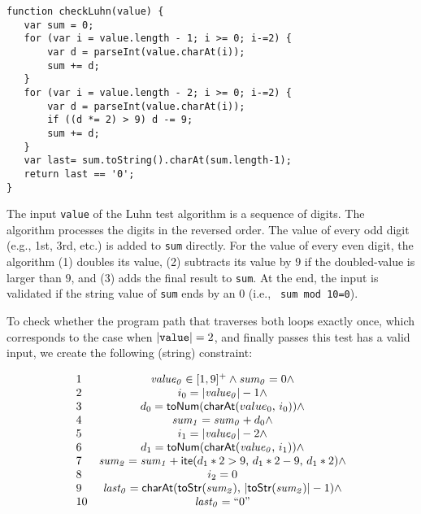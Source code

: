 \documentclass[sigplan,review,anonymous]{acmart}\settopmatter{printfolios=true,printccs=false,printacmref=false}
\begin{document}
%

\begin{Verbatim}[fontsize=\small]
function checkLuhn(value) {
   var sum = 0;
   for (var i = value.length - 1; i >= 0; i-=2) {
       var d = parseInt(value.charAt(i));
       sum += d;
   }	
   for (var i = value.length - 2; i >= 0; i-=2) {
       var d = parseInt(value.charAt(i));
       if ((d *= 2) > 9) d -= 9;
       sum += d;
   }
   var last= sum.toString().charAt(sum.length-1);
   return last == '0';
}
\end{Verbatim}


The input \verb|value| of the Luhn test algorithm is a sequence of digits. The algorithm processes the digits in the reversed order. The value of every odd digit (e.g., 1st, 3rd, etc.) is added to \verb|sum| directly. For the value of every even digit, the algorithm (1) doubles its value, (2) subtracts its value by $9$ if the doubled-value is larger than $9$, and (3) adds the final result to \verb|sum|. At the end, the input is validated if the string value of \verb|sum| ends by an $0$ (i.e., \verb| sum mod 10=0|).

To check whether the program path that traverses both loops exactly once, which corresponds to the case when $| \verb|value||=2$, and finally passes this test has a valid input, we create the following (string) constraint:

$$\begin{array}{lc}
1&	{\it value_0} \in [1,9]^+ \wedge 	{\it sum_0} = 0 \wedge \\
2&	i_0 = |{\it value_0}| -1 \wedge \\
3&	d_0 = \mbox{\textsf{toNum}($\mbox{\textsf{charAt}($value_0$, $i_0$)}$)} \wedge \\
4&	{\it sum_1} = {\it sum_0} + d_0 \wedge\\
5&	i_1 = |{\it value_0}| -2 \wedge \\
6&	d_1 = \mbox{\textsf{toNum}($\mbox{\textsf{charAt}(${\it value_0}$, $i_1$)}$)} \wedge \\
7&	{\it sum_2} = {\it sum_1} + \mbox{\textsf{ite}($d_1*2>9$, $d_1*2 -9$, $d_1*2$)} \wedge\\
8& i_2 = 0\\
9&	{\it last_0} = \mbox{\textsf{charAt}($\mbox{\textsf{toStr}(${\it sum_2}$)}$, $|\mbox{\textsf{toStr}(${\it sum_2}$)}|-1$)} \wedge\\
10&	{\it last_0} =``0"
\end{array}$$
\end{document}
